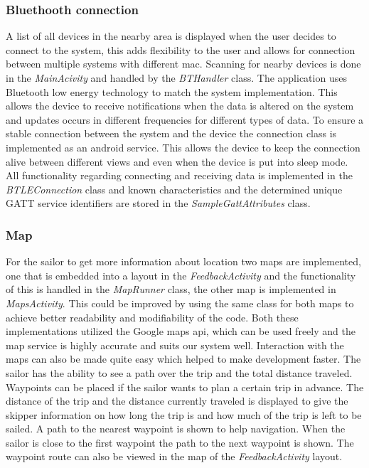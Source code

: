 \subsubsection{Bluethooth connection}
A list of all devices in the nearby area is displayed when the user decides to connect to the system, this adds flexibility to the user and allows for connection between multiple systems with different \gls{mac}. Scanning for nearby devices is done in the \emph{MainAcivity} and handled by the \emph{BTHandler} class. The application uses Bluetooth low energy technology to match the system implementation. This allows the device to receive notifications when the data is altered on the system and updates occurs in different frequencies for different types of data. To ensure a stable connection between the system and the device the connection class is implemented as an android service\cite{android-service}. This allows the device to keep the connection alive between different views and even when the device is put into sleep mode. All functionality regarding connecting and receiving data is implemented in the \emph{BTLEConnection} class and known characteristics and the determined unique GATT service identifiers are stored in the \emph{SampleGattAttributes} class.

\subsubsection{Map}
For the sailor to get more information about location two maps are implemented, one that is embedded into a layout in the \emph{FeedbackActivity} and the functionality of this is handled in the \emph{MapRunner} class, the other map is implemented in \emph{MapsActivity}. This could be improved by using the same class for both maps to achieve better readability and modifiability of the code. Both these implementations utilized the Google maps \gls{api}\cite{gmaps}, which can be used freely and the map service is highly accurate and suits our system well. Interaction with the maps can also be made quite easy which helped to make development faster. The sailor has the ability to see a path over the trip and the total distance traveled. Waypoints can be placed if the sailor wants to plan a certain trip in advance. The distance of the trip and the distance currently traveled is displayed to give the \gls{skipper} information on how long the trip is and how much of the trip is left to be sailed. A path to the nearest waypoint is shown to help navigation. When the sailor is close to the first waypoint the path to the next waypoint is shown. The waypoint route can also be viewed in the map of the \emph{FeedbackActivity} layout.

